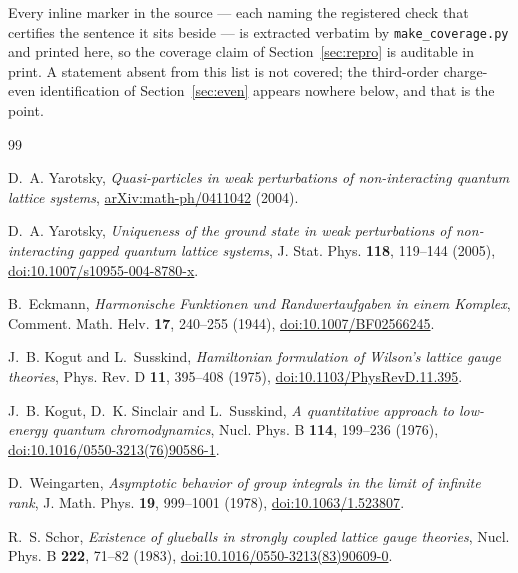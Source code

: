 \documentclass[11pt]{article}
\theoremstyle{plain}
\theoremstyle{definition}
\theoremstyle{remark}
\newcommand{\chk}[1]{}
\begin{document}
Every inline \texttt{\string\chk} marker in the source --- each naming the
registered check that certifies the sentence it sits beside --- is extracted
verbatim by \texttt{make\_coverage.py} and printed here, so the coverage
claim of Section~\ref{sec:repro} is auditable in print. A statement absent
from this list is not covered; the third-order charge-even identification of
Section~\ref{sec:even} appears nowhere below, and that is the point.



\begin{thebibliography}{99}\small\sloppy\raggedright

 D.~A. Yarotsky,
  \emph{Quasi-particles in weak perturbations of non-interacting quantum
  lattice systems},
  \href{https://arxiv.org/abs/math-ph/0411042}{arXiv:math-ph/0411042} (2004).

 D.~A. Yarotsky,
  \emph{Uniqueness of the ground state in weak perturbations of
  non-interacting gapped quantum lattice systems}, J. Stat. Phys.
  \textbf{118}, 119--144 (2005),
  \href{https://doi.org/10.1007/s10955-004-8780-x}{doi:10.1007/s10955-004-8780-x}.

 B.~Eckmann,
  \emph{Harmonische Funktionen und Randwertaufgaben in einem Komplex},
  Comment. Math. Helv. \textbf{17}, 240--255 (1944),
  \href{https://doi.org/10.1007/BF02566245}{doi:10.1007/BF02566245}.

 J.~B. Kogut and L.~Susskind,
  \emph{Hamiltonian formulation of Wilson's lattice gauge theories},
  Phys. Rev. D \textbf{11}, 395--408 (1975),
  \href{https://doi.org/10.1103/PhysRevD.11.395}{doi:10.1103/PhysRevD.11.395}.

 J.~B. Kogut, D.~K. Sinclair and L.~Susskind,
  \emph{A quantitative approach to low-energy quantum chromodynamics},
  Nucl. Phys. B \textbf{114}, 199--236 (1976),
  \href{https://doi.org/10.1016/0550-3213(76)90586-1}{doi:10.1016/0550-3213(76)90586-1}.

 D.~Weingarten,
  \emph{Asymptotic behavior of group integrals in the limit of infinite rank},
  J. Math. Phys. \textbf{19}, 999--1001 (1978),
  \href{https://doi.org/10.1063/1.523807}{doi:10.1063/1.523807}.

 R.~S. Schor,
  \emph{Existence of glueballs in strongly coupled lattice gauge theories},
  Nucl. Phys. B \textbf{222}, 71--82 (1983),
  \href{https://doi.org/10.1016/0550-3213(83)90609-0}{doi:10.1016/0550-3213(83)90609-0}.


\end{thebibliography}
\end{document}
